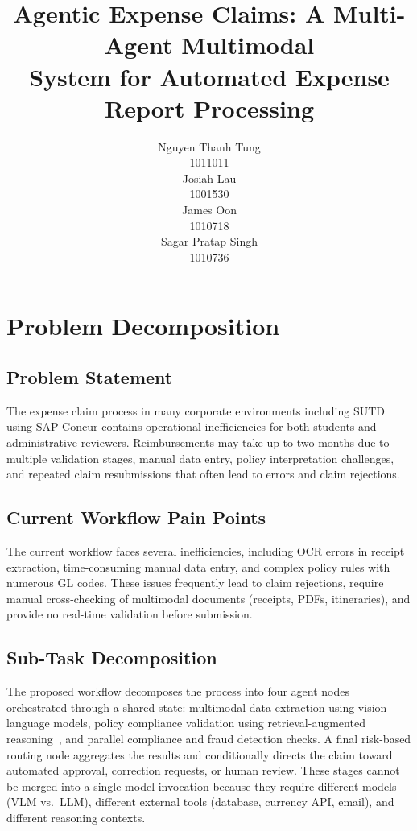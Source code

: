 \documentclass{article}
\title{Agentic Expense Claims: A Multi-Agent Multimodal\\System for Automated Expense Report Processing}
\author{%
  Nguyen Thanh Tung \\
  1011011 \\
  \And
  Josiah Lau \\
  1001530 \\
  \And
  James Oon \\
  1010718 \\
  \And
  Sagar Pratap Singh \\
  1010736 \\
}
\begin{document}
\vspace{-1em}
\maketitle
\vspace{-2em}

\section{Problem Decomposition}
\label{sec:problem}

\subsection{Problem Statement}
\label{sec:problem-statement}

The expense claim process in many corporate environments including SUTD using SAP Concur contains operational inefficiencies for both students and administrative reviewers. Reimbursements may take up to two months due to multiple validation stages, manual data entry, policy interpretation challenges, and repeated claim resubmissions that often lead to errors and claim rejections.

\subsection{Current Workflow Pain Points}
\label{sec:pain-points}

The current workflow faces several inefficiencies, including OCR errors in receipt extraction, time-consuming manual data entry, and complex policy rules with numerous GL codes. These issues frequently lead to claim rejections, require manual cross-checking of multimodal documents (receipts, PDFs, itineraries), and provide no real-time validation before submission.

\subsection{Sub-Task Decomposition}
\label{sec:subtasks}

The proposed workflow decomposes the process into four agent nodes orchestrated through a shared state: multimodal data extraction using vision-language models, policy compliance validation using retrieval-augmented reasoning~\cite{lewis2020rag}, and parallel compliance and fraud detection checks. A final risk-based routing node aggregates the results and conditionally directs the claim toward automated approval, correction requests, or human review. These stages cannot be merged into a single model invocation because they require different models (VLM vs.\ LLM), different external tools (database, currency API, email), and different reasoning contexts.
\end{document}
